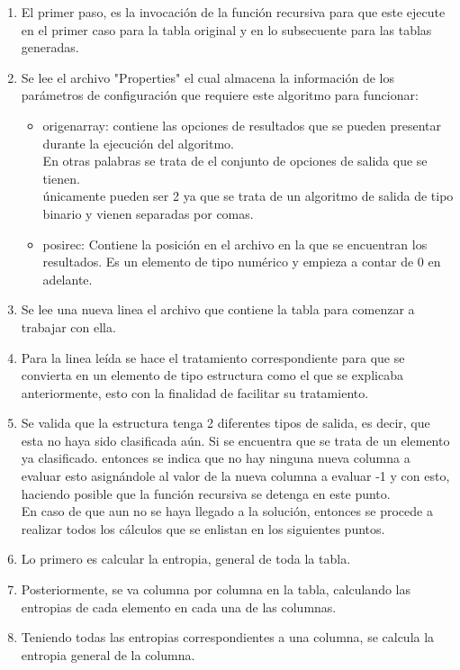 \begin{enumerate}
	\item El primer paso, es la invocación de la función recursiva para que este ejecute en el primer caso para la tabla original y en lo subsecuente para las tablas generadas.
	\item Se lee el archivo "Properties" el cual almacena la información de los parámetros de configuración que requiere este algoritmo para funcionar:
	\begin{itemize}
		\item origenarray: contiene las opciones de resultados que se pueden presentar durante la ejecución del algoritmo.\\ 
		En otras palabras se trata de el conjunto de opciones de salida que se tienen. \\
		únicamente pueden ser 2 ya que se trata de un algoritmo de salida de tipo binario y vienen separadas por comas.
		\item posirec: Contiene la posición en el archivo en la que se encuentran los resultados. Es un elemento de tipo numérico y empieza a contar de 0 en adelante.
	\end{itemize}
	\item Se lee una nueva linea el archivo que contiene la tabla para comenzar a trabajar con ella.
	\item Para la linea leída se hace el tratamiento correspondiente para que se convierta en un elemento de tipo estructura como el que se explicaba anteriormente, esto con la finalidad de facilitar su tratamiento.
	\item Se valida que la estructura tenga 2 diferentes tipos de salida, es decir, que esta no haya sido clasificada aún.
	Si se encuentra que se trata de un elemento ya clasificado. entonces se indica que no hay ninguna nueva columna a evaluar esto asignándole al valor de la nueva columna a evaluar -1 y con esto, haciendo posible que la función recursiva se detenga en este punto.\\
	En caso de que aun no se haya llegado a la solución, entonces se procede a realizar todos los cálculos que se enlistan en los siguientes puntos.
	\item Lo primero es calcular la entropia, general de toda la tabla. 
	\item Posteriormente, se va columna por columna en la tabla, calculando las entropias de cada elemento en cada una de las columnas.
	\item Teniendo todas las entropias correspondientes a una columna, se calcula la entropia general de la columna.

\end{enumerate}
